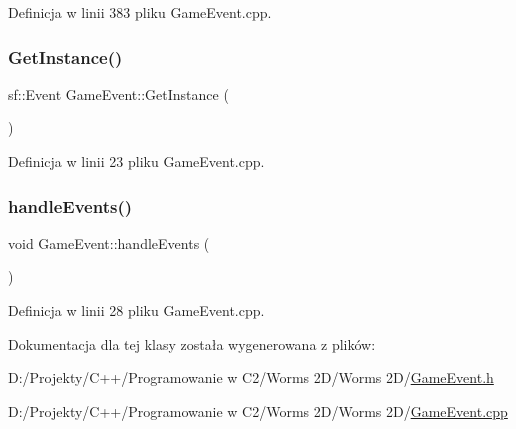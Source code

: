 Definicja w linii 383 pliku Game\+Event.\+cpp.

\mbox{\label{class_game_event_adbf21138a4eb40624a0f40b2ff75f6db}} 
\subsubsection{\texorpdfstring{Get\+Instance()}{GetInstance()}}
{\footnotesize\ttfamily sf\+::\+Event Game\+Event\+::\+Get\+Instance (\begin{DoxyParamCaption}{ }\end{DoxyParamCaption})}



Definicja w linii 23 pliku Game\+Event.\+cpp.

\mbox{\label{class_game_event_a73a56d31069079123f03f20855cb9bf0}} 
\subsubsection{\texorpdfstring{handle\+Events()}{handleEvents()}}
{\footnotesize\ttfamily void Game\+Event\+::handle\+Events (\begin{DoxyParamCaption}{ }\end{DoxyParamCaption})}



Definicja w linii 28 pliku Game\+Event.\+cpp.



Dokumentacja dla tej klasy została wygenerowana z plików\+:\begin{DoxyCompactItemize}
\item 
D\+:/\+Projekty/\+C++/\+Programowanie w C2/\+Worms 2\+D/\+Worms 2\+D/\mbox{\hyperlink{_game_event_8h}{Game\+Event.\+h}}\item 
D\+:/\+Projekty/\+C++/\+Programowanie w C2/\+Worms 2\+D/\+Worms 2\+D/\mbox{\hyperlink{_game_event_8cpp}{Game\+Event.\+cpp}}\end{DoxyCompactItemize}
